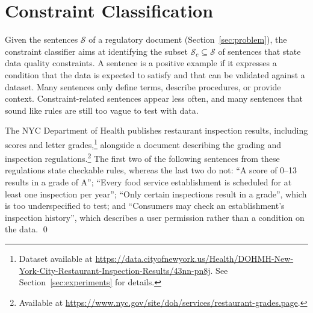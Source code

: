 \section{Constraint Classification}
\label{sec:classifier}
Given the sentences $\mathcal{S}$ of a regulatory document (Section~\ref{sec:problem}), the constraint classifier aims at identifying the subset $\mathcal{S}_c \subseteq \mathcal{S}$ of sentences that state data quality constraints. A sentence is a positive example if it expresses a condition that the data is expected to satisfy and that can be 
validated against a dataset. Many sentences only define terms, describe procedures, or provide context. Constraint-related sentences appear less often, and many sentences that sound like rules are still too vague to test with data. 




\begin{example}
\label{ex:classification}
The NYC Department of Health publishes restaurant inspection results, 
including scores and letter grades,\footnote{Dataset available at 
\url{https://data.cityofnewyork.us/Health/DOHMH-New-York-City-Restaurant-Inspection-Results/43nn-pn8j}. See Section~\ref{sec:experiments} for details.} alongside a document 
describing the grading and inspection regulations.\footnote{Available at 
\url{https://www.nyc.gov/site/doh/services/restaurant-grades.page}.} 
The first two of the following sentences from these regulations state checkable rules, whereas the last two do not: ``A score of 0--13 results in a grade of A''; ``Every food service establishment is scheduled for at least one inspection per year''; ``Only certain inspections result in a grade'', which is too underspecified to test; and ``Consumers may check an establishment's inspection history'', which describes a user permission rather than a condition on the data.
\qed
\end{example}




